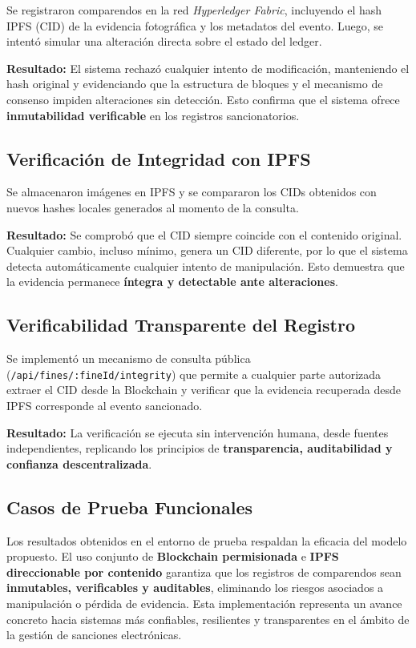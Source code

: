 \documentclass[
    letterpaper, 
    man,   
    spanish,
    12pt,
    donotrepeattitle,
    floatsintext,
    hidelinks %
]{apa7}
\begin{document}
Se registraron comparendos en la red \textit{Hyperledger Fabric}, incluyendo el hash IPFS (CID) de la evidencia fotográfica y los metadatos del evento. Luego, se intentó simular una alteración directa sobre el estado del ledger.

\textbf{Resultado:} El sistema rechazó cualquier intento de modificación, manteniendo el hash original y evidenciando que la estructura de bloques y el mecanismo de consenso impiden alteraciones sin detección. Esto confirma que el sistema ofrece \textbf{inmutabilidad verificable} en los registros sancionatorios.

\subsection{Verificación de Integridad con IPFS}

Se almacenaron imágenes en IPFS y se compararon los CIDs obtenidos con nuevos hashes locales generados al momento de la consulta.

\textbf{Resultado:} Se comprobó que el CID siempre coincide con el contenido original. Cualquier cambio, incluso mínimo, genera un CID diferente, por lo que el sistema detecta automáticamente cualquier intento de manipulación. Esto demuestra que la evidencia permanece \textbf{íntegra y detectable ante alteraciones}.

\subsection{Verificabilidad Transparente del Registro}

Se implementó un mecanismo de consulta pública (\texttt{/api/fines/:fineId/integrity}) que permite a cualquier parte autorizada extraer el CID desde la Blockchain y verificar que la evidencia recuperada desde IPFS corresponde al evento sancionado.

\textbf{Resultado:} La verificación se ejecuta sin intervención humana, desde fuentes independientes, replicando los principios de \textbf{transparencia, auditabilidad y confianza descentralizada}.

\subsection{Casos de Prueba Funcionales}



Los resultados obtenidos en el entorno de prueba respaldan la eficacia del modelo propuesto. El uso conjunto de \textbf{Blockchain permisionada} e \textbf{IPFS direccionable por contenido} garantiza que los registros de comparendos sean \textbf{inmutables, verificables y auditables}, eliminando los riesgos asociados a manipulación o pérdida de evidencia. Esta implementación representa un avance concreto hacia sistemas más confiables, resilientes y transparentes en el ámbito de la gestión de sanciones electrónicas.
\end{document}
